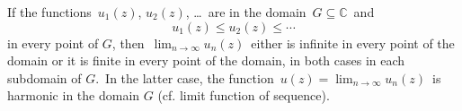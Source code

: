 \documentclass[12pt]{article}
\begin{document}
If the functions\, $u_1(z)$, $u_2(z)$, \ldots\, are  in the domain\, $G \subseteq\mathbb{C}$\, and
    $$u_1(z) \le u_2(z) \le \cdots$$
in every point of $G$, then\, $\lim_{n\to\infty}u_n(z)$\, either is infinite in every point of the domain or it is finite in every point of the domain, in both cases  in each  subdomain of $G$.\, In the latter case, the function\, $u(z) = \lim_{n\to\infty}u_n(z)$\, is harmonic in the domain $G$ (cf. limit function of sequence).
\end{document}
